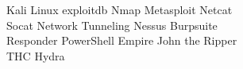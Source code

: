 Kali Linux \textbullet{} exploitdb \textbullet{} Nmap \textbullet{} Metasploit \textbullet{} Netcat \\
Socat \textbullet{} Network Tunneling \textbullet{} Nessus \textbullet{} Burpsuite \\
Responder \textbullet{} PowerShell Empire \textbullet{} John the Ripper \\
THC Hydra